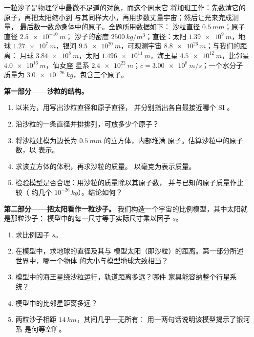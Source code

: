 \begin{problem}
\label{pb:g10:orders-of-magnitude:1}
一粒沙子是物理学中最微不足道的对象，而这个周末它
将加班工作：先数清它的原子，再把太阳缩小到
与其同样大小，再用步数丈量宇宙；然后让光来完成测量，
最后数一数\emph{你}身体中的原子。全题所用数据如下：
沙粒直径 $\qty{0.5}{mm}$；原子直径 $\qty{2.5e-10}{m}$；
沙子的密度 $\qty{2500}{kg/m^3}$；直径：太阳
$\qty{1.39e9}{m}$，地球 $\qty{1.27e7}{m}$，银河
$\qty{9.5e20}{m}$，可观测宇宙 $\qty{8.8e26}{m}$；与我们的距离：
月球 $\qty{3.84e8}{m}$，太阳 $\qty{1.496e11}{m}$，海王星
$\qty{4.5e12}{m}$，比邻星 $\qty{4.0e16}{m}$，仙女座
星系 $\qty{2.4e22}{m}$；$c = \qty{3.00e8}{m/s}$；一个水分子
质量为 $\qty{3.0e-26}{kg}$，包含三个原子。

\medskip
\noindent\textbf{第一部分——沙粒的结构。}
\begin{enumerate}
  \item 以米为，用写出沙粒直径和原子直径，
        并分别指出各自最接近哪个
        SI 。
  \item 沿沙粒的一条直径并排排列，可放多少个原子？
  \item 将沙粒建模为边长为 $\qty{0.5}{mm}$ 的立方体，内部堆满
        原子。估算沙粒中的原子数，以
        表示。
  \item 求该立方体的体积，再求沙粒的质量。
        以毫克为表示质量。
  \item 检验模型是否合理：用沙粒的质量除以其原子数，
        并与已知的原子质量作比较（
        约几个 $10^{-26}\,\unit{kg}$）。结论如何？
\end{enumerate}

\medskip
\noindent\textbf{第二部分——把太阳看作一粒沙子。}
我们构造一个宇宙的比例模型，其中太阳就是那粒沙子：
模型中的每一尺寸等于实际尺寸乘以因子 $s$。
\begin{enumerate}[resume]
  \item 求比例因子 $s$。
  \item 在模型中，求地球的直径及其与
        模型太阳（即沙粒）的距离。第一部分所述世界中，哪一个物体
        的大小与模型地球大致相当？
  \item 模型中的海王星绕沙粒运行，轨道距离多远？哪件
        家具能容纳整个行星系统？
  \item 模型中的比邻星距离多远？
  \item 两粒沙子相距 $\qty{14}{km}$，其间几乎一无所有：
        用一两句话说明该模型揭示了银河系
        是何等空旷。
\end{enumerate}


\end{problem}
